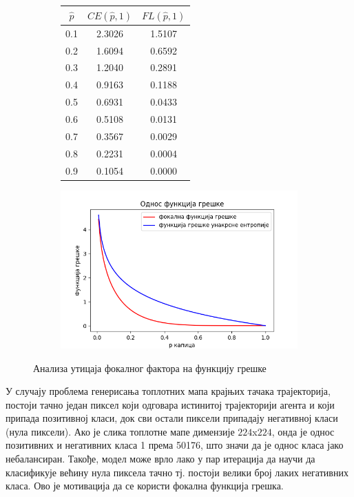 \documentclass[11pt,oneside]{memoir}
\begin{document}
\begin{figure}[H]
  \centering
  \begin{subfigure}{5cm}
    \begin{table}[H]
      \begin{tabular}{c|c|c}
        $\hat{p}$ & $CE(\hat{p}, 1)$ & $FL(\hat{p}, 1)$ \\
        \hline
        0.1 & 2.3026 & 1.5107 \\
        0.2 & 1.6094 & 0.6592 \\
        0.3 & 1.2040 & 0.2891 \\
        0.4 & 0.9163 & 0.1188 \\
        0.5 & 0.6931 & 0.0433 \\
        0.6 & 0.5108 & 0.0131 \\
        0.7 & 0.3567 & 0.0029 \\
        0.8 & 0.2231 & 0.0004 \\
        0.9 & 0.1054 & 0.0000    
      \end{tabular}
    \end{table}
  \end{subfigure}
  \begin{subfigure}{7cm}
    \includegraphics[width=1.0\textwidth]{images/fl_vs_ce.png}
  \end{subfigure}
  \caption{Анализа утицаја фокалног фактора на функцију грешке \label{fl-table}}
\end{figure}

У случају проблема генерисања топлотних мапа крајњих тачака трајекторија, постоји тачно један пиксел који одговара истинитој трајекторији
агента и који припада позитивној класи, док сви остали пиксели припадају негативној класи (нула пиксели). Ако је слика топлотне мапе димензије 
$224$x$224$, онда је однос позитивних и негативних класа
1 према 50176, што значи да је однос класа јако небалансиран. Такође, модел може врло лако у пар итерација да научи
да класификује већину нула пиксела тачно тј. постоји велики број лаких негативних класа. Ово је мотивација да се користи фокална функција грешка.
\end{document}
